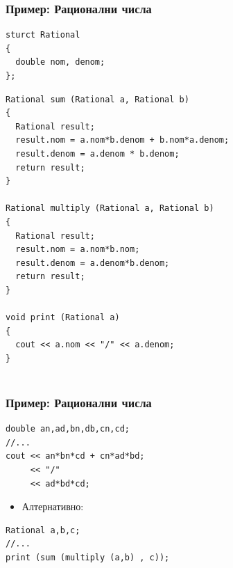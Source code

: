 \documentclass{beamer}
\begin{document}
\begin{frame}[fragile]
\frametitle{Пример: Рационални числа} 

\begin{lstlisting}
sturct Rational
{
  double nom, denom;
};
\end{lstlisting}  

\begin{lstlisting}
Rational sum (Rational a, Rational b)
{
  Rational result;
  result.nom = a.nom*b.denom + b.nom*a.denom;
  result.denom = a.denom * b.denom;
  return result;
}

Rational multiply (Rational a, Rational b)
{
  Rational result;
  result.nom = a.nom*b.nom;
  result.denom = a.denom*b.denom;
  return result;
}

void print (Rational a)
{
  cout << a.nom << "/" << a.denom;
}


\end{lstlisting}  

\end{frame}


\begin{frame}[fragile]
\frametitle{Пример: Рационални числа} 


\begin{lstlisting}
double an,ad,bn,db,cn,cd;
//...
cout << an*bn*cd + cn*ad*bd;
     << "/"
     << ad*bd*cd;
\end{lstlisting}  

\begin{itemize}
  \item Алтернативно:
\end{itemize}


\begin{lstlisting}
Rational a,b,c;
//...
print (sum (multiply (a,b) , c));
\end{lstlisting}  

\end{frame}
\end{document}

